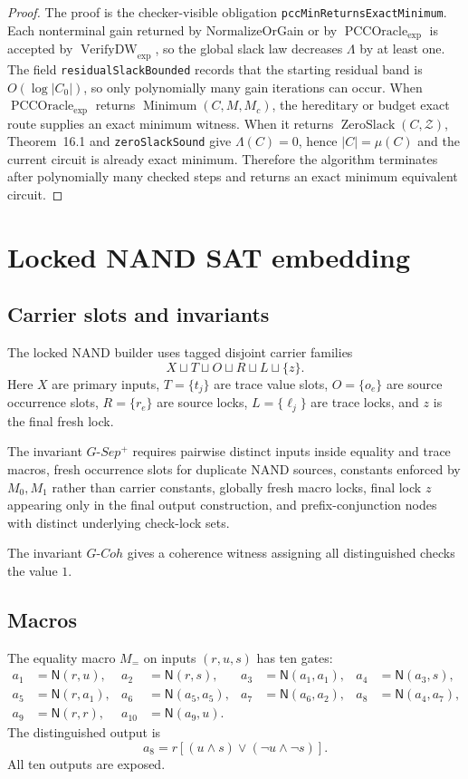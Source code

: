 \documentclass[10.5pt,a4paper]{article}
\newcommand{\NAND}{\mathsf{N}}
\newcommand{\VerifyDW}{\operatorname{VerifyDW}_{\exp}}
\newcommand{\PCCOracle}{\operatorname{PCCOracle}_{\exp}}
\newcommand{\Minimum}{\operatorname{Minimum}}
\newcommand{\ZeroSlack}{\operatorname{ZeroSlack}}
\begin{document}
\begin{proof}
The proof is the checker-visible obligation \texttt{pccMinReturnsExactMinimum}.  Each nonterminal gain returned
by NormalizeOrGain or by \(\PCCOracle\) is accepted by \(\VerifyDW\), so the global slack law decreases
\(\Lambda\) by at least one.  The field \texttt{residualSlackBounded} records that the starting residual band is
\(O(\log |C_0|)\), so only polynomially many gain iterations can occur.  When \(\PCCOracle\) returns
\(\Minimum(C,M,M_c)\), the hereditary or budget exact route supplies an exact minimum witness.  When it
returns \(\ZeroSlack(C,\mathcal Z)\), Theorem~16.1 and \texttt{zeroSlackSound} give \(\Lambda(C)=0\), hence
\(|C|=\mu(C)\) and the current circuit is already exact minimum.  Therefore the algorithm terminates after
polynomially many checked steps and returns an exact minimum equivalent circuit.
\end{proof}

\section{Locked NAND SAT embedding}

\subsection{Carrier slots and invariants}
The locked NAND builder uses tagged disjoint carrier families
\[
X\sqcup T\sqcup O\sqcup R\sqcup L\sqcup\{z\}.
\]
Here \(X\) are primary inputs, \(T=\{t_j\}\) are trace value slots, \(O=\{o_e\}\) are source occurrence slots, \(R=\{r_e\}\) are source locks, \(L=\{\ell_j\}\) are trace locks, and \(z\) is the final fresh lock.

The invariant \(G\text{-}Sep^+\) requires pairwise distinct inputs inside equality and trace macros, fresh occurrence slots for duplicate NAND sources, constants enforced by \(M_0,M_1\) rather than carrier constants, globally fresh macro locks, final lock \(z\) appearing only in the final output construction, and prefix-conjunction nodes with distinct underlying check-lock sets.

The invariant \(G\text{-}Coh\) gives a coherence witness assigning all distinguished checks the value \(1\).

\subsection{Macros}
The equality macro \(M_=\) on inputs \((r,u,s)\) has ten gates:
\[
\begin{aligned}
a_1&=\NAND(r,u),& a_2&=\NAND(r,s),& a_3&=\NAND(a_1,a_1),& a_4&=\NAND(a_3,s),\\
a_5&=\NAND(r,a_1),& a_6&=\NAND(a_5,a_5),& a_7&=\NAND(a_6,a_2),& a_8&=\NAND(a_4,a_7),\\
a_9&=\NAND(r,r),& a_{10}&=\NAND(a_9,u).
\end{aligned}
\]
The distinguished output is
\[
a_8=r[(u\wedge s)\vee(\neg u\wedge\neg s)].
\]
All ten outputs are exposed.
\end{document}
